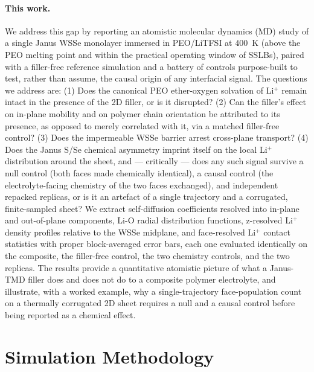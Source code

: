 \documentclass[review, 12pt]{elsarticle}
\numberwithin{equation}{section}
\newcommand{\WSSe}{WSSe\xspace}
\newcommand{\LiTFSI}{LiTFSI\xspace}
\begin{document}
\paragraph{This work.} We address this gap by reporting an atomistic molecular dynamics (MD) study of a single Janus \WSSe monolayer immersed in PEO/\LiTFSI at $400$~K (above the PEO melting point and within the practical operating window of SSLBs), paired with a filler-free reference simulation and a battery of controls purpose-built to test, rather than assume, the causal origin of any interfacial signal. The questions we address are: (1) Does the canonical PEO ether-oxygen solvation of Li$^+$ remain intact in the presence of the 2D filler, or is it disrupted? (2) Can the filler's effect on in-plane mobility and on polymer chain orientation be attributed to its presence, as opposed to merely correlated with it, via a matched filler-free control? (3) Does the impermeable WSSe barrier arrest cross-plane transport? (4) Does the Janus S/Se chemical asymmetry imprint itself on the local Li$^+$ distribution around the sheet, and --- critically --- does any such signal survive a null control (both faces made chemically identical), a causal control (the electrolyte-facing chemistry of the two faces exchanged), and independent repacked replicas, or is it an artefact of a single trajectory and a corrugated, finite-sampled sheet? We extract self-diffusion coefficients resolved into in-plane and out-of-plane components, Li-O radial distribution functions, z-resolved Li$^+$ density profiles relative to the WSSe midplane, and face-resolved Li$^+$ contact statistics with proper block-averaged error bars, each one evaluated identically on the composite, the filler-free control, the two chemistry controls, and the two replicas. The results provide a quantitative atomistic picture of what a Janus-TMD filler does and does not do to a composite polymer electrolyte, and illustrate, with a worked example, why a single-trajectory face-population count on a thermally corrugated 2D sheet requires a null and a causal control before being reported as a chemical effect.

\section{Simulation Methodology}\label{sec:methods}
\end{document}
